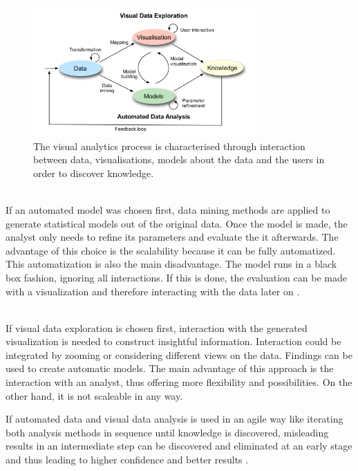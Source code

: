 \begin{figure}[!htb]
\centering
\includegraphics[height=5cm,keepaspectratio]{images/va/va-process.png}
\caption[
    The visual analytics process is characterised through interaction between data, visualisations, models about the data and the users in order to discover knowledge .
]{The visual analytics process is characterised through interaction between data, visualisations, models about the data and the users in order to discover knowledge.}
\label{fig:va-process}
\end{figure}

\begin{enumerate}
 \hfill \\
If an automated model was chosen first, data mining methods are applied to generate statistical models out of the original data. Once the model is made, the analyst only needs to refine its parameters and evaluate the it afterwards. The advantage of this choice is the scalability because it can be fully automatized. This automatization is also the main disadvantage. The model runs in a black box fashion, ignoring all interactions. If this is done, the evaluation can be made with a visualization and therefore interacting with the data later on .

 \hfill \\
If visual data exploration is chosen first, interaction with the generated visualization is needed to construct insightful information. Interaction could be integrated by zooming or considering different views on the data. Findings can be used to create automatic models. The main advantage of this approach is the interaction with an analyst, thus offering more flexibility and possibilities. On the other hand, it is not scaleable in any way.
\end{enumerate}

If automated data and visual data analysis is used in an agile way like iterating both analysis methods in sequence until knowledge is discovered, misleading results in an intermediate step can be discovered and eliminated at an early stage and thus leading to higher confidence and better results .


